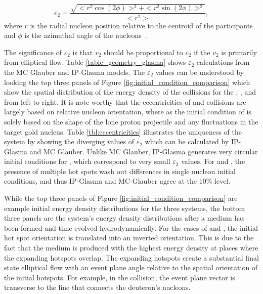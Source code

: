\begin{equation}
\label{eqn:eccentricity_equation}
\varepsilon_2 = \frac{\sqrt{<r^2 \cos(2\phi)>^2+<r^2 \sin(2\phi)>^2}}{<r^2>},
\end{equation}
where $r$ is the radial nucleon position relative to the centroid of the participants and $\phi$ is the azimuthal angle of the nucleons~\cite{PhysRevC.81.054905}. 

The significance of $\varepsilon_2$ is that $v_2$ should be proportional to $\varepsilon_2$ if the $v_2$ is primarily from elliptical flow. Table \ref{table_geometry_glasma} shows $\varepsilon_2$ calculations from the MC Glauber and IP-Glasma models. The $\varepsilon_2$ values can be understood by looking the top three panels of Figure \ref{fig:initial_condition_comparison} which show the spatial distribution of the energy density of the collisions for the \pau, \dau, and \hau from left to right. It is note worthy that the eccentricities of \dau and \hau collisions are largely based on relative nucleon orientation, where as the initial condition of \pau is solely based on the shape of the lone proton projectile and any fluctuations in the target gold nucleus. Table \ref{tbl:eccentricities} illustrates the uniqueness of the \pau system by showing the diverging values of $\varepsilon_2$ which can be calculated by IP-Glasma and MC Glauber. Unlike MC Glauber, IP-Glasma generates very circular initial conditions for \pau, which correspond to very small $\varepsilon_2$ values. For \dau and \hau, the presence of multiple hot spots wash out differences in single nucleon initial conditions, and thus IP-Glasma and MC-Glauber agree at the 10\% level. 

While the top three panels of Figure \ref{fig:initial_condition_comparison} are example initial energy density distributions for the three systems, the bottom three panels are the system's energy density distributions after a medium has been formed and time evolved hydrodynamically. For the cases of \dau and \hau, the initial hot spot orientation is translated into an inverted orientation. This is due to the fact that the medium is produced with the highest energy density at places where the expanding hotspots overlap. The expanding hotspots create a substantial final state elliptical flow with an event plane angle relative to the spatial orientation of the initial hotspots. For example, in the \dau collision, the event plane vector is transverse to the line that connects the deuteron's nucleons. 

